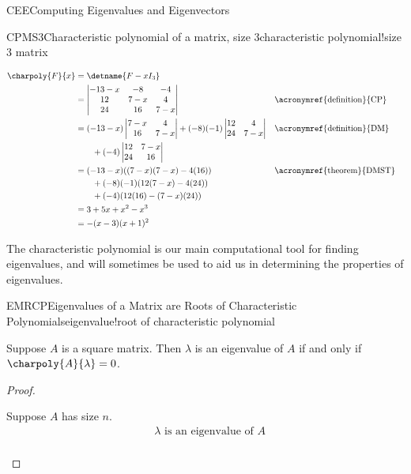 \begin{subsect}{CEE}{Computing Eigenvalues and Eigenvectors}
\begin{example}{CPMS3}{Characteristic polynomial of a matrix, size 3}{characteristic polynomial!size 3 matrix}
\begin{para}
%
\begin{align*}
\charpoly{F}{x}&=\detname{F-xI_3}\\
&=
\begin{vmatrix}
-13-x & -8 & -4\\
12 & 7-x & 4\\
24 & 16 & 7-x
\end{vmatrix}&&\text{\acronymref{definition}{CP}}\\
%
&=
(-13-x)
\begin{vmatrix}
7-x & 4\\
16 & 7-x
\end{vmatrix}
+(-8)(-1)
\begin{vmatrix}
12  & 4\\
24  & 7-x
\end{vmatrix}&&\text{\acronymref{definition}{DM}}\\
&\quad\quad
+(-4)
\begin{vmatrix}
12 & 7-x\\
24 & 16
\end{vmatrix}\\
%
&=(-13-x)((7-x)(7-x)-4(16))&&\text{\acronymref{theorem}{DMST}}\\
&\quad\quad +(-8)(-1)(12(7-x)-4(24))\\
&\quad\quad +(-4)(12(16)-(7-x)(24))\\
%
&=3+5x+x^2-x^3\\
%
&=-(x-3)(x+1)^2
%
\end{align*}
\end{para}
%
\end{example}
%
\begin{para}The characteristic polynomial is our main computational tool for finding eigenvalues, and will sometimes be used to aid us in determining the properties of eigenvalues.\end{para}
%
\begin{theorem}{EMRCP}{Eigenvalues of a Matrix are Roots of Characteristic Polynomials}{eigenvalue!root of characteristic polynomial}
\begin{para}Suppose $A$ is a square matrix.
Then $\lambda$ is an eigenvalue of $A$ if and only if $\charpoly{A}{\lambda}=0$.\end{para}
\end{theorem}
%
\begin{proof}
%
\begin{para}Suppose $A$ has size $n$.
%
\begin{align*}
&\text{$\lambda$ is an eigenvalue of $A$}\\

\end{align*}
\end{para}
\end{proof}
\end{subsect}

